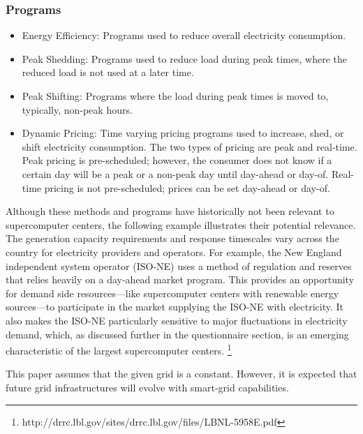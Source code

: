 \subsubsection{Programs}
\begin{itemize}
\item Energy Efficiency:  Programs used to reduce overall electricity consumption.

\item Peak Shedding:  Programs used to reduce load during peak times, 
where the reduced load is not used at a later time. 

\item Peak Shifting:  Programs where the load during peak times is moved to, typically, non-peak hours. 

\item Dynamic Pricing:  Time varying pricing programs used to increase, shed,
 or shift electricity consumption. 
The two types of pricing are peak and real-time.  Peak pricing is pre-scheduled; however, the consumer 
does not know if a certain day will be a peak or a non-peak day until day-ahead or day-of.  
Real-time pricing is not pre-scheduled; prices can be set day-ahead or day-of.
\end{itemize}

Although these methods and programs have historically not been relevant to supercomputer centers,
the following example illustrates their potential relevance.
The generation capacity requirements and response timescales vary across the country for electricity 
providers and operators. For example, the New England independent system operator (ISO-NE) uses a method 
of regulation and reserves that relies heavily on a day-ahead market program. This provides an opportunity 
for demand side resources---like supercomputer centers with renewable energy sources---to participate in the 
market supplying the ISO-NE with electricity.  It also makes the ISO-NE particularly sensitive to major 
fluctuations in electricity demand, which, as discussed further in the questionnaire section, is an emerging 
characteristic of the largest supercomputer centers.  
\footnote {http://drrc.lbl.gov/sites/drrc.lbl.gov/files/LBNL-5958E.pdf}

This paper assumes that the given grid is a constant. However, it is expected 
that future grid infrastructures will 
evolve with smart-grid capabilities. 

